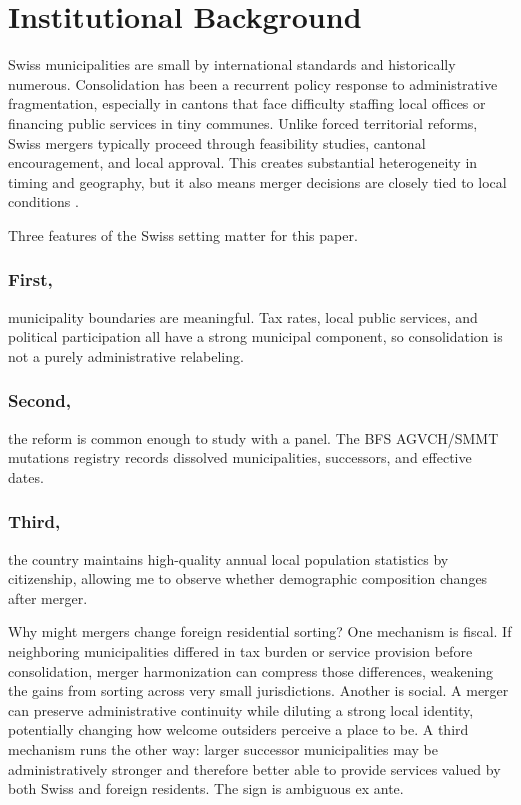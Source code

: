 \documentclass[12pt]{article}
\begin{document}
\section{Institutional Background}

Swiss municipalities are small by international standards and historically numerous. Consolidation has been a recurrent policy response to administrative fragmentation, especially in cantons that face difficulty staffing local offices or financing public services in tiny communes. Unlike forced territorial reforms, Swiss mergers typically proceed through feasibility studies, cantonal encouragement, and local approval. This creates substantial heterogeneity in timing and geography, but it also means merger decisions are closely tied to local conditions \citep{tavares2018joining, swianiewicz2010amalgamation}.

Three features of the Swiss setting matter for this paper. \subsubsection*{First,} municipality boundaries are meaningful. Tax rates, local public services, and political participation all have a strong municipal component, so consolidation is not a purely administrative relabeling. \subsubsection*{Second,} the reform is common enough to study with a panel. The BFS AGVCH/SMMT mutations registry records dissolved municipalities, successors, and effective dates. \subsubsection*{Third,} the country maintains high-quality annual local population statistics by citizenship, allowing me to observe whether demographic composition changes after merger.

Why might mergers change foreign residential sorting? One mechanism is fiscal. If neighboring municipalities differed in tax burden or service provision before consolidation, merger harmonization can compress those differences, weakening the gains from sorting across very small jurisdictions. Another is social. A merger can preserve administrative continuity while diluting a strong local identity, potentially changing how welcome outsiders perceive a place to be. A third mechanism runs the other way: larger successor municipalities may be administratively stronger and therefore better able to provide services valued by both Swiss and foreign residents. The sign is ambiguous ex ante.
\end{document}
